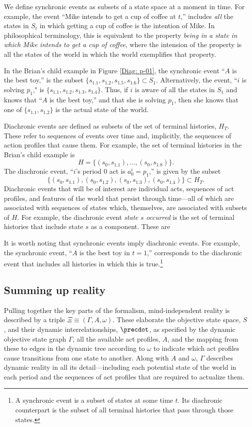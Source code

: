 \documentclass[
11pt,
titlepage,
reqno,
]{article}%
\theoremstyle{definition}
\begin{document}
We define synchronic events as subsets of a state space at a moment in time. 
For example, the event ``Mike intends to get a cup of coffee at $t$,'' includes \textit{all} the states in $S_t$ in which getting a cup of coffee is the intention of Mike. 
In philosophical terminology, this is equivalent to the property \textit{being in a state in which Mike intends to get a cup of coffee}, where the intension of the property is all the states of the world in which the world exemplifies that property.

In the Brian's child example in Figure \ref{Diag: p-01}, the synchronic event ``$A$ is the best toy,'' is the subset $\{s_{1.1},s_{1.2},s_{1.5},s_{1.6}\}\subset S_1$.
Alternatively, the event, ``$i$ is solving $p_1$," is $\{s_{1.1},s_{1.2},s_{1.3},s_{1.4}\}$.
Thus, if $i$ is aware of all the states in $S_1$ and knows that ``$A$ is the best toy,'' and that she is solving $p_1$, then she knows that one of $\{s_{1.1},s_{1.2}\}$ is the actual state of the world.

Diachronic events are defined as subsets of the set of terminal histories, $H_T$.
These refer to sequences of events over time and, implicitly, the sequences of action profiles that cause them.
For example, the set of terminal histories in the Brian's child example is
\[
	H=\{(s_0,s_{1.1}),\ldots,(s_0,s_{1.8})\}.
\]
The diachronic event, ``$i$'s period 0 act is $a^i_0=p_1$,'' is given by the subset
\[
	\{(s_0,s_{1.1}),(s_0,s_{1.2}),(s_0,s_{1.3}),(s_0,s_{1.4})\}\subset H_T.
\] 
Diachronic events that will be of interest are individual acts, sequences of act profiles, and features of the world that persist through time---all of which are associated with sequences of states which, themselves, are associated with subsets of $H$.
For example, the diachronic event \textit{state $s$ occurred} is the set of terminal histories that include state $s$ as a component.
These are 

It is worth noting that synchronic events imply diachronic events.
For example, the synchronic event, ``$A$ is the best toy in $t=1$,'' corresponds to the diachronic event that includes all histories in which this is true.\footnote
{
	A synchronic event is a subset of states at some time $t$. Its diachronic counterpart is the subset of all terminal histories that pass through those states.
}

\subsection{Summing up reality}
Pulling together the key parts of the formalism, mind-independent reality is described by a triple $\Xi\equiv(\Gamma,A,\omega)$.
These elaborate the objective state space, $S$, and their dynamic interrelationships, $\precdot$, as specified by the dynamic objective state graph $\Gamma$, all the available act profiles, $A$, and the mapping from these to edges in the dynamic tree according to $\omega$ to indicate which act profiles cause transitions from one state to another. 
Along with $A$ and $\omega$, $\Gamma$ describes dynamic reality in all its detail---including each potential state of the world in each period and the sequences of act profiles that are required to actualize them. 
	
\end{document}
